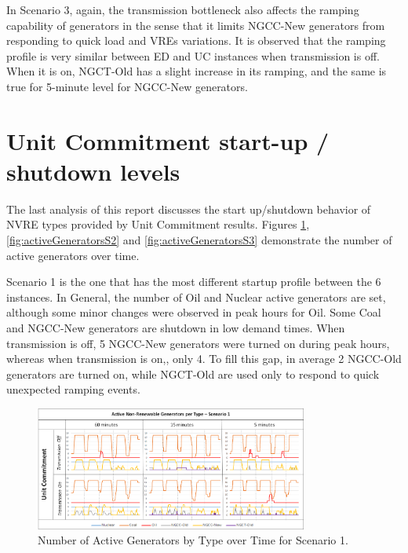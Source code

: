 \documentclass[12pt,LUDisStyle,twosided]{book}
\begin{document}
In Scenario 3, again, the transmission bottleneck also affects the ramping capability of generators in the sense that it limits NGCC-New generators from responding to quick load and VREs variations. It is observed that the ramping profile is very similar between ED and UC instances when transmission is off. When it is on, NGCT-Old has a slight increase in its ramping, and the same is true for 5-minute level for NGCC-New generators. 

\section{Unit Commitment start-up / shutdown levels} \label{section:uconoffstatus}

The last analysis of this report discusses the start up/shutdown behavior of NVRE types provided by Unit Commitment results. Figures \ref{fig:activeGeneratorsS1}, \ref{fig:activeGeneratorsS2} and \ref{fig:activeGeneratorsS3} demonstrate the number of active generators over time.

Scenario 1 is the one that has the most different startup profile between the 6 instances. In General, the number of Oil and Nuclear active generators are set, although some minor changes were observed in peak hours for Oil. Some Coal and NGCC-New generators are shutdown in low demand times. When transmission is off, 5 NGCC-New generators were turned on during peak hours, whereas when transmission is on,, only 4. To fill this gap, in average 2 NGCC-Old generators are turned on, while NGCT-Old are used only to respond to quick unexpected ramping events.

\begin{figure}[H] 
  \centering
  
	  \includegraphics[width=0.8\textwidth,keepaspectratio]{activeGeneratorsS1.png}
  
  \caption{Number of Active Generators by Type over Time for Scenario 1.}
  \label{fig:activeGeneratorsS1}
  \end{figure}
  
\end{document}
